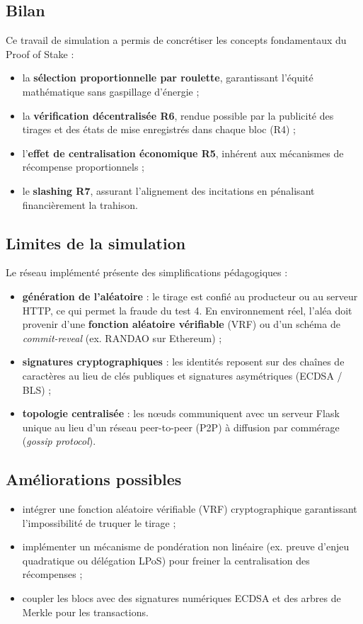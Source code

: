 \documentclass[11pt,a4paper]{article}
\begin{document}
\subsection{Bilan}
Ce travail de simulation a permis de concrétiser les concepts fondamentaux du Proof of Stake :
\begin{itemize}
    \item la \textbf{sélection proportionnelle par roulette}, garantissant l'équité mathématique sans gaspillage d'énergie ;
    \item la \textbf{vérification décentralisée R6}, rendue possible par la publicité des tirages et des états de mise enregistrés dans chaque bloc (R4) ;
    \item l'\textbf{effet de centralisation économique R5}, inhérent aux mécanismes de récompense proportionnels ;
    \item le \textbf{slashing R7}, assurant l'alignement des incitations en pénalisant financièrement la trahison.
\end{itemize}

\subsection{Limites de la simulation}
Le réseau implémenté présente des simplifications pédagogiques :
\begin{itemize}
    \item \textbf{génération de l'aléatoire} : le tirage est confié au producteur ou au serveur HTTP, ce qui permet la fraude du test 4. En environnement réel, l'aléa doit provenir d'une \textbf{fonction aléatoire vérifiable} (VRF) ou d'un schéma de \emph{commit-reveal} (ex. RANDAO sur Ethereum) ;
    \item \textbf{signatures cryptographiques} : les identités reposent sur des chaînes de caractères au lieu de clés publiques et signatures asymétriques (ECDSA / BLS) ;
    \item \textbf{topologie centralisée} : les nœuds communiquent avec un serveur Flask unique au lieu d'un réseau peer-to-peer (P2P) à diffusion par commérage (\emph{gossip protocol}).
\end{itemize}

\subsection{Améliorations possibles}
\begin{itemize}
    \item intégrer une fonction aléatoire vérifiable (VRF) cryptographique garantissant l'impossibilité de truquer le tirage ;
    \item implémenter un mécanisme de pondération non linéaire (ex. preuve d'enjeu quadratique ou délégation LPoS) pour freiner la centralisation des récompenses ;
    \item coupler les blocs avec des signatures numériques ECDSA et des arbres de Merkle pour les transactions.
\end{itemize}
\end{document}
